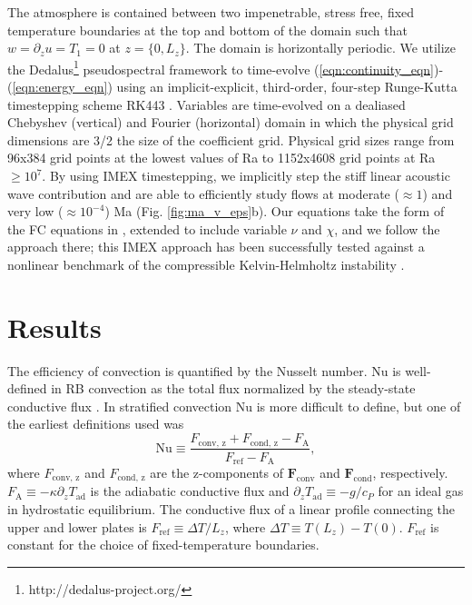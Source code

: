 \documentclass[aps, prl, twocolumn, nofootinbib, groupedaddress, amsfonts, amssymb, amsmath]{revtex4-1}
\begin{document}
The atmosphere is contained between two 
impenetrable, stress free, fixed temperature boundaries at
the top and bottom of the domain such that 
$w = \partial_z u = T_1 = 0$ at $z = \{0, L_z\}$. The domain
is horizontally periodic. We utilize the 
Dedalus\footnote{http://dedalus-project.org/} \cite{burns&all2016} pseudospectral framework 
 to time-evolve  
(\ref{eqn:continuity_eqn})-(\ref{eqn:energy_eqn}) 
using an implicit-explicit, third-order, four-step 
Runge-Kutta timestepping scheme RK443 \cite{ascher&all1997}.  
Variables are time-evolved on a dealiased Chebyshev (vertical)
and Fourier (horizontal) domain in which the
physical grid dimensions are 3/2 the size of the coefficient grid.  
Physical grid sizes range from
96x384 grid points at the lowest values of 
Ra to 1152x4608 grid points at Ra $\geq 10^{7}$. 
By using IMEX timestepping, we implicitly step the 
stiff linear acoustic wave contribution and are able to
efficiently study flows at moderate ($\approx 1$) and very low ($\approx 10^{-4}$)
Ma (Fig. \ref{fig:ma_v_eps}b).  Our equations take the form
of the FC equations in \cite{lecoanet&all2014}, extended to include variable
$\nu$ and $\chi$, and we follow the approach there; 
this IMEX approach has been successfully 
tested against a nonlinear benchmark  of the compressible 
Kelvin-Helmholtz instability \cite{Lecoanet_et_al_2016_KH}.

\section{Results}
\label{sec:results}

The efficiency of convection is quantified by the Nusselt number.  
Nu is well-defined in RB convection
as the total flux normalized by the steady-state conductive flux 
\cite{johnston&doering2009, otero&all2002}.
In stratified convection Nu is more difficult to define, but one of the earliest definitions used
was \cite{graham1975,hurlburt&all1984}
\begin{equation}
\text{Nu} \equiv \frac{F_{\text{conv, z}} + F_{\text{cond, z}} - F_{\text{A}}}{F_{\text{ref}} - F_{\text{A}}},
\label{eqn:nusselt}
\end{equation}
where $F_{\text{conv, z}}$ and $F_{\text{cond, z}}$ are the 
z-components of $\bm{F}_{\text{conv}}$ and $\bm{F}_{\text{cond}}$,
respectively.  $F_{\text{A}} \equiv -\kappa \partial_z T_{\text{ad}}$ 
is the adiabatic conductive flux and
$\partial_z T_{\text{ad}} \equiv - g / c_{P}$ 
for an ideal gas in hydrostatic equilibrium.
The conductive flux of a linear profile connecting the upper
and lower plates
is $F_{\text{ref}} \equiv \Delta T / L_z$, 
where $\Delta T \equiv T(L_z) - T(0)$.  $F_{\text{ref}}$ is constant for 
the choice of fixed-temperature boundaries.
\end{document}
